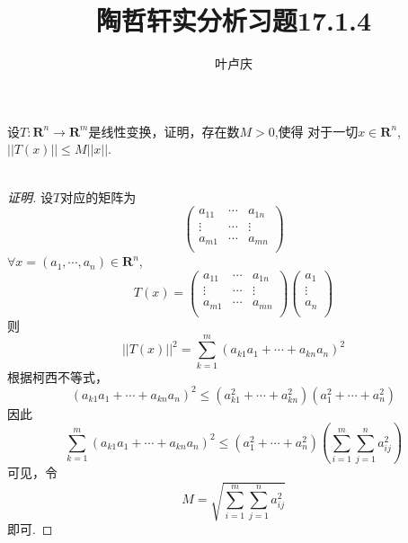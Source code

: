 \documentclass{article}
\begin{document}
\renewcommand{\refname}{参考文献}
\begin{CJK}{UTF8}{gbsn}
  \title{陶哲轩实分析习题17.1.4}\author{叶卢庆}\date{}
  \maketitle\noindent
  设$T:\mathbf{R}^n\to\mathbf{R}^m$是线性变换，证明，存在数$M>0$,使得
  对于一切$x\in\mathbf{R}^n$,$||T(x)||\leq M||x||$.\\\\
\begin{proof}[证明]
  设$T$对应的矩阵为
  \begin{equation}
    \begin{pmatrix}
      a_{11}&\cdots&a_{1n}\\
\vdots&\cdots&\vdots\\
a_{m1}&\cdots&a_{mn}\\
    \end{pmatrix}
  \end{equation}
$\forall x=(a_1,\cdots,a_n)\in\mathbf{R}^n$,
\begin{equation}
  T(x)=\begin{pmatrix}
    a_{11}&\cdots&a_{1n}\\
\vdots&\cdots&\vdots\\
a_{m1}&\cdots&a_{mn}\\
  \end{pmatrix}\begin{pmatrix}
    a_1\\
\vdots\\
a_n\\
  \end{pmatrix}
\end{equation}
则
\begin{equation}
||T(x)|| ^2= \sum_{k=1}^m(a_{k1}a_1+\cdots+a_{kn}a_n)^2
\end{equation}
根据柯西不等式，
\begin{equation}
(a_{k1}a_1+\cdots+a_{kn}a_n)^2\leq (a_{k1}^2+\cdots+a_{kn}^2)(a_1^2+\cdots+a_n^2)
\end{equation}
因此
\begin{equation}
  \sum_{k=1}^m(a_{k1}a_1+\cdots+a_{kn}a_n)^2\leq (a_1^2+\cdots+a_n^2)(\sum_{i=1}^m\sum_{j=1}^na_{ij}^2)
\end{equation}
可见，令
\begin{equation}
M=\sqrt{\sum_{i=1}^m\sum_{j=1}^na_{ij}^2}  
\end{equation}
即可.





  
\end{proof}

  
  
  
  
  
\end{CJK}
\end{document}

